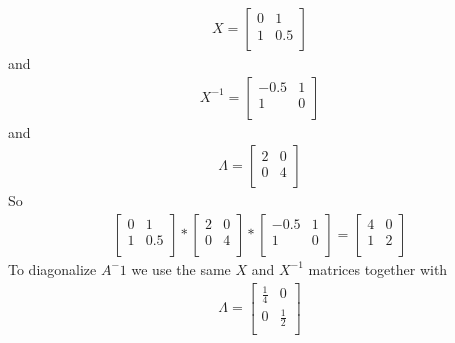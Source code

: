 \documentclass[a4paper,11pt]{article}
\begin{document}
\begin{align*}
X = 
\begin{bmatrix}
0 & 1   \\
1 & 0.5 \\
\end{bmatrix}
\end{align*}
and 
\begin{align*}
X^{-1} = 
\begin{bmatrix}
-0.5 & 1   \\
1 & 0 \\
\end{bmatrix}
\end{align*}
and 
\begin{align*}
\Lambda = 
\begin{bmatrix}
2 & 0   \\
0 & 4 \\
\end{bmatrix}
\end{align*}
So
\begin{align*}
\begin{bmatrix}
0 & 1   \\
1 & 0.5 \\
\end{bmatrix}
*
\begin{bmatrix}
2 & 0   \\
0 & 4 \\
\end{bmatrix}
*
\begin{bmatrix}
-0.5 & 1   \\
1 & 0 \\
\end{bmatrix}
=
\begin{bmatrix}
4 & 0   \\
1 & 2 \\
\end{bmatrix}
\end{align*}
To diagonalize $A^-1$ we use the same $X$ and $X^{-1}$ matrices together with 
\begin{align*}
\Lambda = 
\begin{bmatrix}
\frac{1}{4} & 0 \\
0 & \frac{1}{2} \\
\end{bmatrix}
\end{align*}
\end{document}
